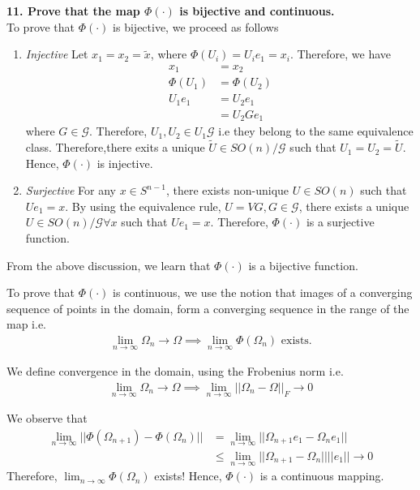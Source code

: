 \documentclass[11pt]{article}
\begin{document}
\textbf{11. Prove that the map $\Phi(\cdot)$ is bijective and continuous.}\\
To prove that $\Phi(\cdot)$ is bijective, we proceed as follows
\begin{enumerate}
\item \emph{Injective} Let $x_1 = x_2 = \tilde{x}$, where $\Phi(U_i) = U_ie_1 = x_i$. Therefore, we have
\begin{align*}
x_1 &= x_2\\
\Phi(U_1) &= \Phi(U_2)\\
U_1 e_1 &= U_2 e_1 \\
&= U_2 G e_1
\end{align*} where $G \in \mathcal{G}$. Therefore, $U_1,U_2 \in U_1\mathcal{G}$ i.e they belong to the same equivalence class. Therefore,there exits a unique $\tilde{U} \in SO(n)/\mathcal{G}$ such that $U_1 = U_2 = \tilde{U}$.
Hence, $\Phi(\cdot)$ is injective.
\item \emph{Surjective}
For any $x \in S^{n-1}$, there exists non-unique $U \in SO(n)$ such that $Ue_1 = x$. By using the equivalence rule, $U = VG, G\in \mathcal{G}$, there exists a unique $U \in SO(n)/\mathcal{G} \forall x$ such that $Ue_1 = x$. Therefore, $\Phi(\cdot)$ is a surjective function. 
\end{enumerate}
From the above discussion, we learn that $\Phi(\cdot)$ is a bijective function. 

To prove that $\Phi(\cdot)$ is continuous, we use the notion that images of a converging sequence of points in the domain, form a converging sequence in the range of the map i.e. 
\begin{align*}
\lim_{n\to \infty} \Omega_n \rightarrow \Omega \implies \lim_{n\to \infty} \Phi(\Omega_n)\text{ exists}.
\end{align*}

We define convergence in the domain, using the Frobenius norm i.e.
\begin{align*}
\lim_{n\to \infty} \Omega_n \rightarrow \Omega \implies \lim_{n\to \infty} ||\Omega_n - \Omega||_{F} \rightarrow 0
\end{align*}

We observe that
\begin{align*}
\lim_{n\to \infty} || \Phi(\Omega_{n+1}) - \Phi(\Omega_{n})|| &= \lim_{n\to \infty} || \Omega_{n+1}e_1 - \Omega_n e_1||\\
&\leq \lim_{n\to \infty} ||\Omega_{n+1} - \Omega_n|| ||e_1|| \rightarrow 0
\end{align*}
Therefore, $\lim_{n\to \infty} \Phi(\Omega_{n})$ exists! 
Hence, $\Phi(\cdot)$ is a continuous mapping.
\end{document}
